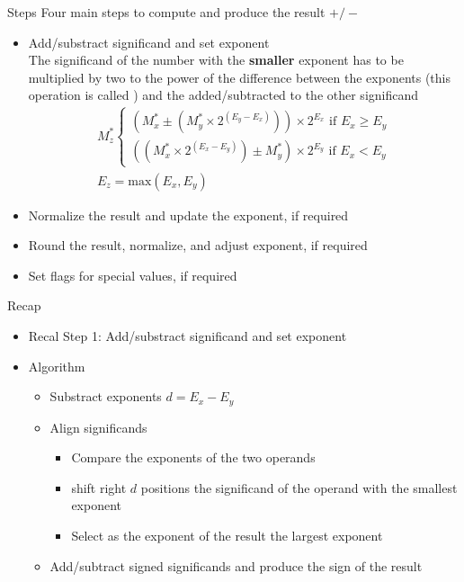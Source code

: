 \begin{parag}{Steps}
    Four main steps to compute and produce the result $+/-$
    \begin{itemize}
        \item Add/substract significand and set exponent \\
            The significand of the number with the \textbf{smaller} exponent has to be multiplied by two to the power of the difference between the exponents (this operation is called ) and the added/subtracted to the other significand
            \begin{align*}
                M_z^* \begin{cases}
                    (M_x^* \pm (M_y^* \times 2^{(E_y - E_x)})) \times 2^{E_x} \text{ if } E_x \geq E_y \\
                    ((M_x^* \times 2^{(E_x - E_y)}) \pm M_y^* ) \times 2^{E_y} \text{ if } E_x < E_y
                \end{cases} \\
                E_z = \text{max}(E_x, E_y)
            \end{align*}
        \item Normalize the result and update the exponent, if required 
             \item Round the result, normalize, and adjust exponent, if required
             \item Set flags for special values, if required
    \end{itemize}

\end{parag}


\begin{parag}{Recap}
\begin{itemize}
    \item Recal Step 1: Add/substract significand and set exponent
    \item Algorithm
        \begin{itemize}
            \item Substract exponents $d = E_x - E_y$
            \item Align significands
                \begin{itemize}
                    \item Compare the exponents of the two operands
                    \item shift right $d$ positions the significand of the operand with the smallest exponent
                    \item Select as the exponent of the result the largest exponent
                \end{itemize}
            \item Add/subtract signed significands and produce the sign of the result
        \end{itemize}
\end{itemize}
\end{parag}


